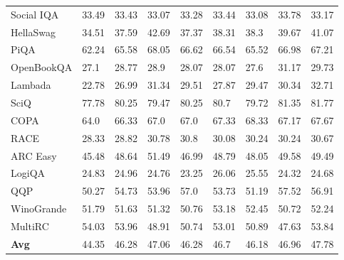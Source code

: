 \documentclass{article}
\theoremstyle{definition}
\theoremstyle{remark}
\begin{document}
\begin{table}[!ht]
\begin{tabular}{lllllllll}
        Social IQA & 33.49 & 33.43 & 33.07 & 33.28 & 33.44 & 33.08 & 33.78 & 33.17 \\ 
        HellaSwag & 34.51 & 37.59 & 42.69 & 37.37 & 38.31 & 38.3 & 39.67 & 41.07 \\ 
        PiQA & 62.24 & 65.58 & 68.05 & 66.62 & 66.54 & 65.52 & 66.98 & 67.21 \\ 
        OpenBookQA & 27.1 & 28.77 & 28.9 & 28.07 & 28.07 & 27.6 & 31.17 & 29.73 \\ 
        Lambada & 22.78 & 26.99 & 31.34 & 29.51 & 27.87 & 29.47 & 30.34 & 32.71 \\ 
        SciQ & 77.78 & 80.25 & 79.47 & 80.25 & 80.7 & 79.72 & 81.35 & 81.77 \\ 
        COPA & 64.0 & 66.33 & 67.0 & 67.0 & 67.33 & 68.33 & 67.17 & 67.67 \\ 
        RACE & 28.33 & 28.82 & 30.78 & 30.8 & 30.08 & 30.24 & 30.24 & 30.67 \\ 
        ARC Easy & 45.48 & 48.64 & 51.49 & 46.99 & 48.79 & 48.05 & 49.58 & 49.49 \\ 
        LogiQA & 24.83 & 24.96 & 24.76 & 23.25 & 26.06 & 25.55 & 24.32 & 24.68 \\ 
        QQP & 50.27 & 54.73 & 53.96 & 57.0 & 53.73 & 51.19 & 57.52 & 56.91 \\ 
        WinoGrande & 51.79 & 51.63 & 51.32 & 50.76 & 53.18 & 52.45 & 50.72 & 52.24 \\ 
        MultiRC & 54.03 & 53.96 & 48.91 & 50.74 & 53.01 & 50.89 & 47.63 & 53.84 \\ 
        \midrule
        \textbf{Avg} & 44.35 & 46.28 & 47.06 & 46.28 & 46.7 & 46.18 & 46.96 & 47.78 \\ \bottomrule
    \end{tabular}
\end{table}
\end{document}
